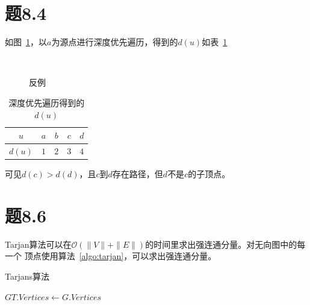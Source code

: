 \documentclass[a4paper,twoside]{article}
\begin{document}
\begin{spacing}{1.2}
\section{题8.4}

如图~\ref{fig:t84_example}，以$a$为源点进行深度优先遍历，得到的$d(u)$如表~\ref{tbl:du}

\begin{figure}[htbp]
	\centering
	\label{fig:t84_example}
	~
	\caption{反例}
\end{figure}

\begin{table}[H]
	\centering
	\label{tbl:du}
	\begin{tabular}{ccccc}
		\toprule
		$u$ & $a$ & $b$ & $c$ & $d$ \\
		\midrule
		$d(u)$ & $1$ & $2$ & $3$ & $4$ \\
		\bottomrule
	\end{tabular}
	\caption{深度优先遍历得到的$d(u)$}
\end{table}

可见$d(c)>d(d)$，且$c$到$d$存在路径，但$d$不是$c$的子顶点。

\section{题8.6}

Tarjan算法可以在$\mathcal{O}(\|V\|+\|E\|)$的时间里求出强连通分量。对无向图中的每一个
顶点使用算法~\ref{algo:tarjan}，可以求出强连通分量。

\begin{algorithm}
	\caption{Tarjans算法}
	\label{algo:tarjan}
	\begin{algorithmic}[1]		
		\State $GT.Vertices\gets G.Vertices$


\end{algorithmic}
\end{algorithm}
\end{spacing}
\end{document}
